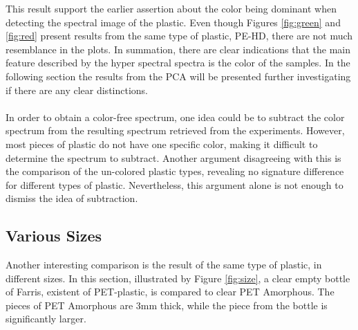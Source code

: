 
\noindent
This result support the earlier assertion about the color being dominant when detecting the spectral image of the plastic. Even though Figures \ref{fig:green} and \ref{fig:red} present results from the same type of plastic, PE-HD, there are not much resemblance in the plots. In summation, there are clear indications that the main feature described by the hyper spectral spectra is the color of the samples. In the following section the results from the PCA will be presented further investigating if there are any clear distinctions.
\\\\
In order to obtain a color-free spectrum, one idea could be to subtract the color spectrum from the resulting spectrum retrieved from the experiments. However, most pieces of plastic do not have one specific color, making it difficult to determine the spectrum to subtract. Another argument disagreeing with this is the comparison of the un-colored plastic types, revealing no signature difference for different types of plastic. Nevertheless, this argument alone is not enough to dismiss the idea of subtraction. 


\subsection{Various Sizes}
Another interesting comparison is the result of the same type of plastic, in different sizes. In this section, illustrated by Figure \ref{fig:size}, a clear empty bottle of Farris, existent of PET-plastic, is compared to clear PET Amorphous. The pieces of PET Amorphous are 3mm thick, while the piece from the bottle is significantly larger. 

